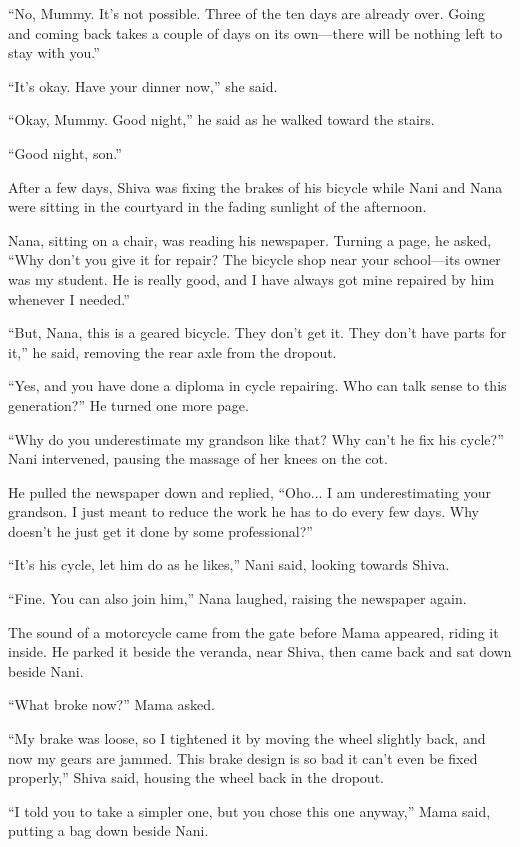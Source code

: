 ``No, Mummy. It's not possible. Three of the ten days are already over. Going and coming back takes a couple of days on its own—there will be nothing left to stay with you.''

``It's okay. Have your dinner now,'' she said.

``Okay, Mummy. Good night,'' he said as he walked toward the stairs.

``Good night, son.''

After a few days, Shiva was fixing the brakes of his bicycle while Nani and Nana were sitting in the courtyard in the fading sunlight of the afternoon.

Nana, sitting on a chair, was reading his newspaper. Turning a page, he asked, ``Why don't you give it for repair? The bicycle shop near your school—its owner was my student. He is really good, and I have always got mine repaired by him whenever I needed.''

``But, Nana, this is a geared bicycle. They don't get it. They don't have parts for it,'' he said, removing the rear axle from the dropout.

``Yes, and you have done a diploma in cycle repairing. Who can talk sense to this generation?'' He turned one more page.

``Why do you underestimate my grandson like that? Why can't he fix his cycle?'' Nani intervened, pausing the massage of her knees on the cot.

He pulled the newspaper down and replied, ``Oho... I am underestimating your grandson. I just meant to reduce the work he has to do every few days. Why doesn't he just get it done by some professional?''

``It's his cycle, let him do as he likes,'' Nani said, looking towards Shiva.

``Fine. You can also join him,'' Nana laughed, raising the newspaper again.

The sound of a motorcycle came from the gate before Mama appeared, riding it inside. He parked it beside the veranda, near Shiva, then came back and sat down beside Nani.

``What broke now?'' Mama asked.

``My brake was loose, so I tightened it by moving the wheel slightly back, and now my gears are jammed. This brake design is so bad it can't even be fixed properly,'' Shiva said, housing the wheel back in the dropout.

``I told you to take a simpler one, but you chose this one anyway,'' Mama said, putting a bag down beside Nani.

